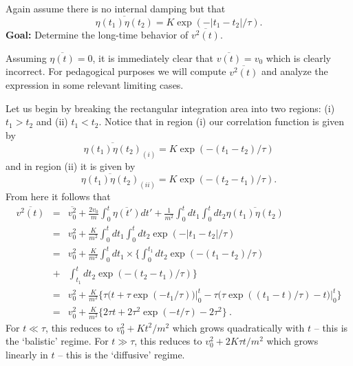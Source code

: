 
Again assume there is no internal damping but that
\begin{equation}
\overline{\eta(t_1) \eta(t_2)} = K \exp(-|t_1-t_2|/\tau).
\end{equation}
\textbf{Goal:} Determine the long-time behavior of $\overline{v^2(t)}$.

Assuming $\overline{\eta(t)}=0$, it is immediately clear that $\overline{v(t)}=v_0$ which is clearly incorrect. For pedagogical purposes we will compute $\overline{v^2(t)}$ and analyze the expression in some relevant limiting cases.

Let us begin by breaking the rectangular integration area into two regions: (i) $t_1>t_2$ and (ii) $t_1 < t_2$. Notice that in region (i) our correlation function is given by 
\begin{equation}
\overline{\eta(t_1) \eta(t_2)}_{(i)} = K \exp(-(t_1-t_2)/\tau)
\end{equation}
and in region (ii) it is given by 
\begin{equation}
\overline{\eta(t_1) \eta(t_2)}_{(ii)} = K \exp(-(t_2-t_1)/\tau).
\end{equation}
From here it follows that
\begin{eqnarray}
\overline{v^2(t)}&=& \overline{v_0^2} + \frac{2 v_0 }{m} \int_{0}^{t} \overline{\eta(t')} dt' + \frac{1}{m^2} \int_{0}^{t} dt_1 \int_{0}^{t} dt_2 \overline{\eta(t_1) \eta(t_2)} \nonumber \\
&=& v_0^2 + \frac{K}{m^2} \int_{0}^{t} dt_1 \int_{0}^{t} dt_2 \exp(-|t_1-t_2|/\tau) \nonumber \\
&=& v_0^2 + \frac{K}{m^2} \int_{0}^{t} dt_1 \times \bigg\{ \int_{0}^{t_1} dt_2 \exp(-(t_1-t_2)/\tau) \nonumber \\ &+& \int_{t_1}^{t} dt_2 \exp(-(t_2-t_1)/\tau)\bigg\} \nonumber \\
&=& v_0^2 + \frac{K}{m^2} \bigg\{ \tau \bigg(t + \tau \exp(-t_1/\tau)\bigg) \bigg|_{0}^{t} - \tau \bigg(\tau \exp((t_1-t)/\tau)-t\bigg) \bigg|_{0}^{t} \bigg\} \nonumber \\
&=& \boxed{v_0^2 + \frac{K}{m^2} \bigg\{ 2 \tau t  + 2 \tau^2 \exp(-t/\tau) -2 \tau^2 \bigg\}}~.
\end{eqnarray}
For $t\ll\tau$, this reduces to $v_0^2+K t^2 / m^2$ which grows quadratically with $t$ -- this is the `balistic' regime. For $t\gg \tau$, this reduces to $v_0^2+2K \tau t / m^2$ which grows linearly in $t$ -- this is the `diffusive' regime.